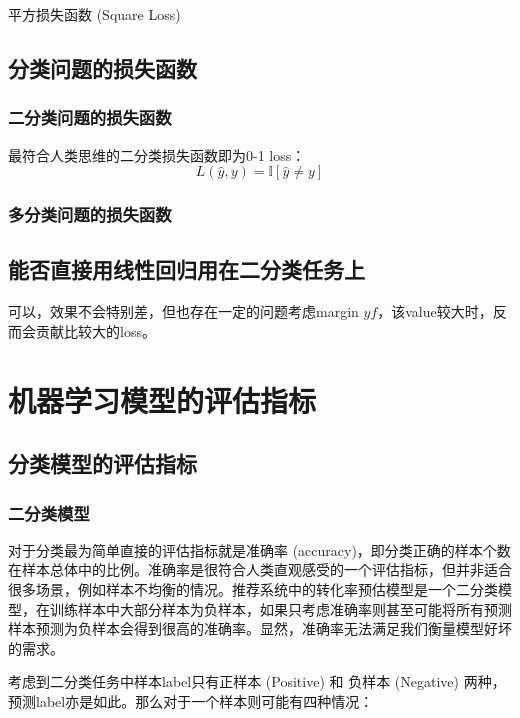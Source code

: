 \documentclass[lang=cn,newtx,10pt,scheme=chinese,color=black]{elegantbook}
\begin{document}
平方损失函数 (Square Loss)

\section{分类问题的损失函数}

\subsection{二分类问题的损失函数}

最符合人类思维的二分类损失函数即为0-1 loss：
\begin{equation}
  L(\hat{y}, y) = \mathbb{I}[\hat{y} \neq y]
\end{equation}

\subsection{多分类问题的损失函数}

\section{能否直接用线性回归用在二分类任务上}

可以，效果不会特别差，但也存在一定的问题考虑margin $yf$，该value较大时，反而会贡献比较大的loss。


\chapter{机器学习模型的评估指标}

\section{分类模型的评估指标}

\subsection{二分类模型}

对于分类最为简单直接的评估指标就是准确率 (accuracy)，即分类正确的样本个数在样本总体中的比例。准确率是很符合人类直观感受的一个评估指标，但并非适合很多场景，例如样本不均衡的情况。推荐系统中的转化率预估模型是一个二分类模型，在训练样本中大部分样本为负样本，如果只考虑准确率则甚至可能将所有预测样本预测为负样本会得到很高的准确率。显然，准确率无法满足我们衡量模型好坏的需求。

考虑到二分类任务中样本label只有正样本 (Positive) 和 负样本 (Negative) 两种，预测label亦是如此。那么对于一个样本则可能有四种情况：
\end{document}
